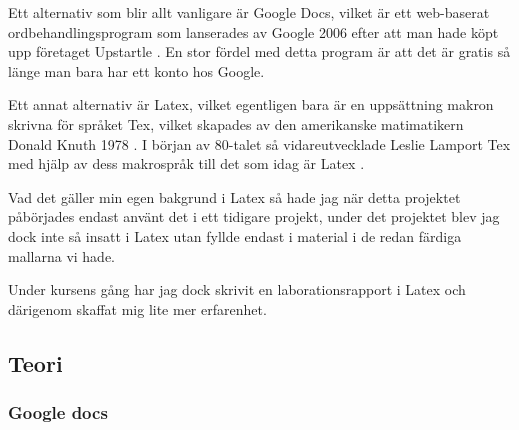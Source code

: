 
Ett alternativ som blir allt vanligare är Google Docs, vilket är ett web-baserat ordbehandlingsprogram som lanserades av Google 2006 \cite{docs_launch} efter att man hade köpt upp företaget Upstartle \cite{upstartle}. En stor fördel med detta program är att det är gratis så länge man bara har ett konto hos Google.


Ett annat alternativ är Latex, vilket egentligen bara är en uppsättning makron skrivna för språket Tex, vilket skapades av den amerikanske matimatikern Donald Knuth 1978 \cite{donald_knuth}. I början av 80-talet så vidareutvecklade Leslie Lamport Tex med hjälp av dess makrospråk till det som 
idag är Latex \cite{leslie_lamport}.

Vad det gäller min egen bakgrund i Latex så hade jag när detta projektet påbörjades endast använt det i ett tidigare projekt, under det projektet blev jag dock inte så insatt i Latex utan fyllde endast i material i de redan färdiga mallarna vi hade.

Under kursens gång har jag dock skrivit en laborationsrapport i Latex och därigenom skaffat mig lite mer erfarenhet.


\subsection{Teori}
\subsubsection{Google docs} %


